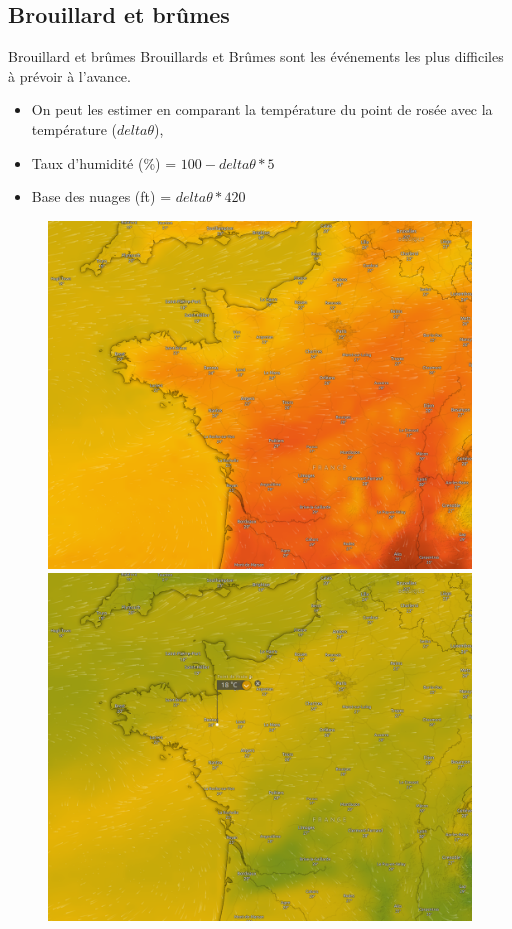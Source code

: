 \documentclass{beamer}
\begin{document}
\subsection{Brouillard et brûmes}
\begin{frame}{Brouillard et brûmes}
  Brouillards et Brûmes sont les événements les plus difficiles à prévoir à l'avance.
  \pause
  \begin{itemize}
    \item On peut les estimer en comparant la température du point de rosée avec la température ($delta\theta$), \pause
    \item Taux d'humidité (\%) = $100 - delta\theta * 5$ \pause
    \item Base des nuages (ft) = $delta\theta * 420$ \pause
  \end{itemize}

  \begin{figure}
    \centering
    \includegraphics[scale=0.5]{images/windy-temperature.png}
    \includegraphics[scale=0.5]{images/windy-point-de-rosee.png}
  \end{figure}
\end{frame}
\end{document}
